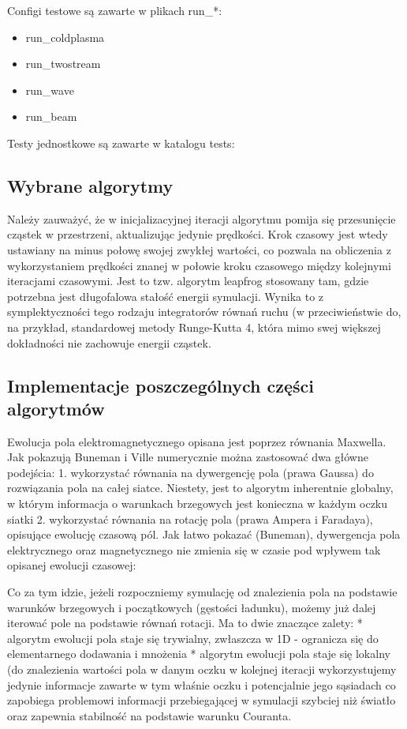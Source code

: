 Configi testowe są zawarte w plikach run\_*: %
\begin{itemize}
\item run\_coldplasma
\item run\_twostream
\item run\_wave
\item run\_beam
\end{itemize}

Testy jednostkowe są zawarte w katalogu tests:

\subsection{Wybrane algorytmy}

Należy zauważyć, że w inicjalizacyjnej iteracji algorytmu pomija się przesunięcie cząstek w przestrzeni, aktualizując jedynie
prędkości. Krok czasowy jest wtedy ustawiany na minus połowę swojej zwykłej wartości, co pozwala na obliczenia
z wykorzystaniem prędkości znanej w połowie kroku czasowego między kolejnymi iteracjami czasowymi. Jest to tzw. algorytm
leapfrog %
stosowany tam, gdzie potrzebna jest długofalowa stałość energii symulacji. Wynika to z symplektyczności %
tego rodzaju integratorów równań ruchu (w przeciwieństwie do, na przykład, standardowej metody Runge-Kutta 4, która
mimo swej większej dokładności nie zachowuje energii cząstek.

\subsection{Implementacje poszczególnych części algorytmów}

Ewolucja pola elektromagnetycznego opisana jest poprzez równania Maxwella. Jak pokazują Buneman i Ville %
numerycznie można zastosować dwa główne podejścia: %
1. wykorzystać równania na dywergencję pola (prawa Gaussa) do rozwiązania pola na całej siatce. Niestety, jest to
algorytm inherentnie globalny, w którym informacja o warunkach brzegowych jest konieczna w każdym oczku siatki
2. wykorzystać równania na rotację pola (prawa Ampera i Faradaya), opisujące ewolucję czasową pól. Jak łatwo pokazać (Buneman),
dywergencja pola elektrycznego oraz magnetycznego nie zmienia się w czasie pod wpływem tak opisanej ewolucji czasowej:

Co za tym idzie, jeżeli rozpoczniemy symulację od znalezienia pola na podstawie warunków brzegowych i początkowych (gęstości
ładunku), możemy już dalej iterować pole na podstawie równań rotacji. Ma to dwie znaczące zalety:
* algorytm ewolucji pola staje się trywialny, zwłaszcza w 1D - ogranicza się do elementarnego dodawania i mnożenia %
* algorytm ewolucji pola staje się lokalny (do znalezienia wartości pola w danym oczku w kolejnej iteracji wykorzystujemy
jedynie informacje zawarte w tym właśnie oczku i potencjalnie jego sąsiadach %
co zapobiega problemowi informacji przebiegającej w symulacji szybciej niż światło oraz zapewnia stabilność na podstawie
warunku Couranta.
